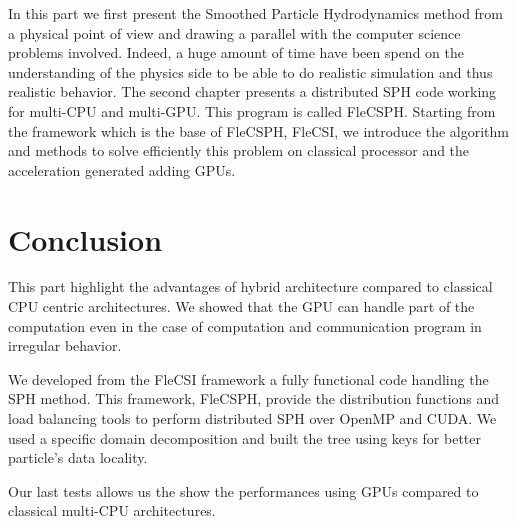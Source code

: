 In this part we first present the Smoothed Particle Hydrodynamics method from a physical point of view and drawing a parallel with the computer science problems involved. 
Indeed, a huge amount of time have been spend on the understanding of the physics side to be able to do realistic simulation and thus realistic behavior. 
The second chapter presents a distributed SPH code working for multi-CPU and multi-GPU. 
This program is called FleCSPH. 
Starting from the framework which is the base of FleCSPH, FleCSI, we introduce the algorithm and methods to solve efficiently this problem on classical processor and the acceleration generated adding GPUs. 







\chapter*{Conclusion}
This part highlight the advantages of hybrid architecture compared to classical CPU centric architectures. 
We showed that the GPU can handle part of the computation even in the case of computation and communication program in irregular behavior. 

We developed from the FleCSI framework a fully functional code handling the SPH method. 
This framework, FleCSPH, provide the distribution functions and load balancing tools to perform distributed SPH over OpenMP and CUDA.
We used a specific domain decomposition and built the tree using keys for better particle's data locality. 

Our last tests allows us the show the performances using GPUs compared to classical multi-CPU architectures. 
